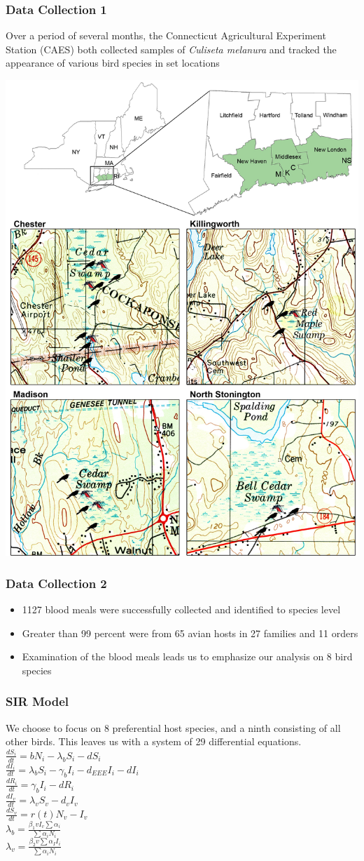 \documentclass{beamer}
\begin{document}
\begin{frame}
\frametitle{Data Collection 1}
\begin{block}{}
Over a period of several months, the Connecticut Agricultural Experiment Station (CAES) both collected samples of \textit{Culiseta melanura} and tracked the appearance of various bird species in set locations
\begin{center}
\includegraphics[width=0.35\linewidth]{EEESitefig}
\end{center}
\end{block}
\end{frame}


\begin{frame}
\frametitle{Data Collection 2}
\begin{itemize}
\item 1127 blood meals were successfully collected and identified to species level
\item Greater than 99 percent were from 65 avian hosts in 27 families and 11 orders
\item Examination of the blood meals leads us to emphasize our analysis on 8  bird species
\end{itemize}
\end{frame}

\begin{frame}
\frametitle{SIR Model}
\begin{block}{}
We choose to focus on 8 preferential host species, and a ninth consisting of all other birds.  This leaves us with a system of 29 differential equations. \\
$\frac{dS_i}{dt} = \textit{b}N_i - \lambda_bS_i - \textit{d}S_i$ \\
$\frac{dI_i}{dt} =  \lambda_bS_i -  \gamma_bI_i-d_{EEE}I_i - \textit{d}I_i$ \\
$\frac{dR_i}{dt} = \gamma_bI_i - \textit{d}R_i$ \\
$\frac{dI_v}{dt} = \lambda_vS_v - d_vI_v$ \\
$\frac{dS_v}{dt} = r(t)N_v - I_v$ \\
$\lambda_b = \frac{\beta_1vI_v\sum\alpha_i}{\sum\alpha_iN_i}$ \\
$\lambda_v = \frac{\beta_2v\sum\alpha_II_i}{\sum\alpha_iN_i}$ \\
\end{block}
\end{frame}
\end{document}
